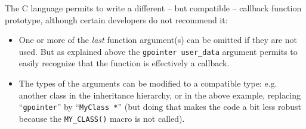 The C language permits to write a different -- but compatible -- callback function prototype, although certain developers do not recommend it:
\begin{itemize}
  \item One or more of the \emph{last} function argument(s) can be omitted if they are not used. But as explained above the \lstinline{gpointer user_data} argument permits to easily recognize that the function is effectively a callback.
  \item The types of the arguments can be modified to a compatible type: e.g. another class in the inheritance hierarchy, or in the above example, replacing ``\lstinline{gpointer}'' by ``\lstinline{MyClass *}'' (but doing that makes the code a bit less robust because the \lstinline{MY_CLASS()} macro is not called).
\end{itemize}
